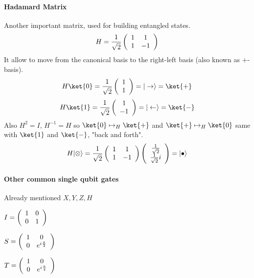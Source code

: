\documentclass[10pt]{report}
\begin{document}
\paragraph{Hadamard Matrix} Another important matrix, used for building entangled states.
$$H=\frac{1}{\sqrt{2}}\left(\begin{array}{c c}
1&1\\1&-1
\end{array}\right)$$
It allow to move from the canonical basis to the right-left basis (also known as +- basis).
$$H\ket{0} = \frac{1}{\sqrt{2}}\left(\begin{array}{c}
1\\1
\end{array}\right) = |\rightarrow\rangle = \ket{+}$$
$$H\ket{1} = \frac{1}{\sqrt{2}}\left(\begin{array}{c}
1\\-1
\end{array}\right) = |\leftarrow\rangle = \ket{-}$$
Also $H^2 = I$, $H^{-1} = H$ so $\ket{0}\mapsto_H \ket{+}$ and $\ket{+}\mapsto_H \ket{0}$ same with $\ket{1}$ and $\ket{-}$, "back and forth".\\
$$H|\otimes\rangle = \frac{1}{\sqrt{2}}\left(\begin{array}{c c}
1&1\\1&-1
\end{array}\right)\left(\begin{array}{c}
\frac{1}{\sqrt{2}}\\\frac{1}{\sqrt{2}}i
\end{array}\right) = |\bullet\rangle$$
\paragraph{Other common single qubit gates} Already mentioned $X,Y,Z,H$\begin{list}{}{}
	\item $I = \left(\begin{array}{c c}
	1&0\\0&1
	\end{array}\right)$
	\item $S = \left(\begin{array}{c c}
	1&0\\0&e^{i\frac{\pi}{2}}
	\end{array}\right)$
	\item $T = \left(\begin{array}{c c}
	1&0\\0&e^{i\frac{\pi}{4}}
	\end{array}\right)$
\end{list}
\end{document}

